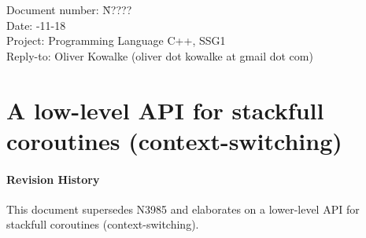 \documentclass[a4paper,10pt,DIV15]{scrartcl}
\begin{document}
\small
\begin{tabbing}
    Document number: \= N????\\
    Date:            -11-18 \\
    Project:         \> Programming Language C++, SSG1\\
    Reply-to:        \> Oliver Kowalke (oliver dot kowalke at gmail dot com)\\
\end{tabbing}

\section*{A low-level API for stackfull coroutines (context-switching)}


\tableofcontents


\paragraph*{Revision History}
This document supersedes N3985 and elaborates on a lower-level API for stackfull
coroutines (context-switching).













\end{document}
